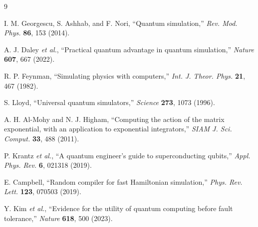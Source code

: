 \documentclass[11pt,a4paper]{article}
\begin{document}
\begin{thebibliography}{9}

I. M. Georgescu, S. Ashhab, and F. Nori, ``Quantum simulation,'' \textit{Rev. Mod. Phys.} \textbf{86}, 153 (2014).

A. J. Daley \textit{et al.}, ``Practical quantum advantage in quantum simulation,'' \textit{Nature} \textbf{607}, 667 (2022).

R. P. Feynman, ``Simulating physics with computers,'' \textit{Int. J. Theor. Phys.} \textbf{21}, 467 (1982).

S. Lloyd, ``Universal quantum simulators,'' \textit{Science} \textbf{273}, 1073 (1996).

A. H. Al-Mohy and N. J. Higham, ``Computing the action of the matrix exponential, with an application to exponential integrators,'' \textit{SIAM J. Sci. Comput.} \textbf{33}, 488 (2011).

P. Krantz \textit{et al.}, ``A quantum engineer's guide to superconducting qubits,'' \textit{Appl. Phys. Rev.} \textbf{6}, 021318 (2019).

E. Campbell, ``Random compiler for fast Hamiltonian simulation,'' \textit{Phys. Rev. Lett.} \textbf{123}, 070503 (2019).

Y. Kim \textit{et al.}, ``Evidence for the utility of quantum computing before fault tolerance,'' \textit{Nature} \textbf{618}, 500 (2023).

\end{thebibliography}
\end{document}
